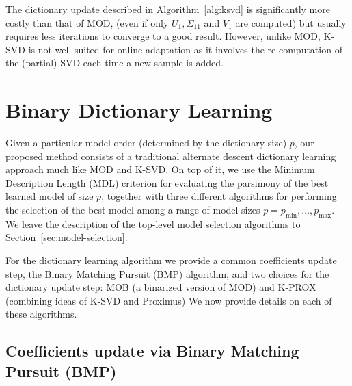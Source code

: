 \documentclass[twocolumn]{IEEEtran}
\theoremstyle{definition}
\begin{document}
The dictionary update described in Algorithm~\ref{alg:ksvd} is significantly more costly than that of MOD, (even if only $U_1,\Sigma_{11}$ and $V_1$ are computed) but usually requires less iterations to converge to a good result. However, unlike MOD, K-SVD is not well suited for online adaptation as it involves the re-computation of the (partial) SVD each time a new sample is added.


\section{Binary Dictionary Learning}
\label{sec:bdl}

Given a particular model order (determined by the dictionary size) $p$, our proposed method consists of a traditional alternate descent dictionary learning approach much like MOD and K-SVD. On top of it, we use the Minimum Description Length (MDL) criterion for evaluating the parsimony of the best learned model of size $p$, together with  three different algorithms for performing the selection of the best model among a range of model sizes $p=p_{\min},\ldots,p_{\max}$. We leave the description of the top-level model selection algorithms to Section~\ref{sec:model-selection}.

For the dictionary learning algorithm we provide a common coefficients update step, the Binary Matching Pursuit (BMP) algorithm, and  two choices for the dictionary update step: MOB (a binarized version of MOD) and K-PROX (combining ideas of K-SVD and Proximus)  We now provide details on each of these algorithms.

\subsection{Coefficients update via Binary Matching Pursuit (BMP)}
\label{sec:bdl:bmp}
\end{document}
